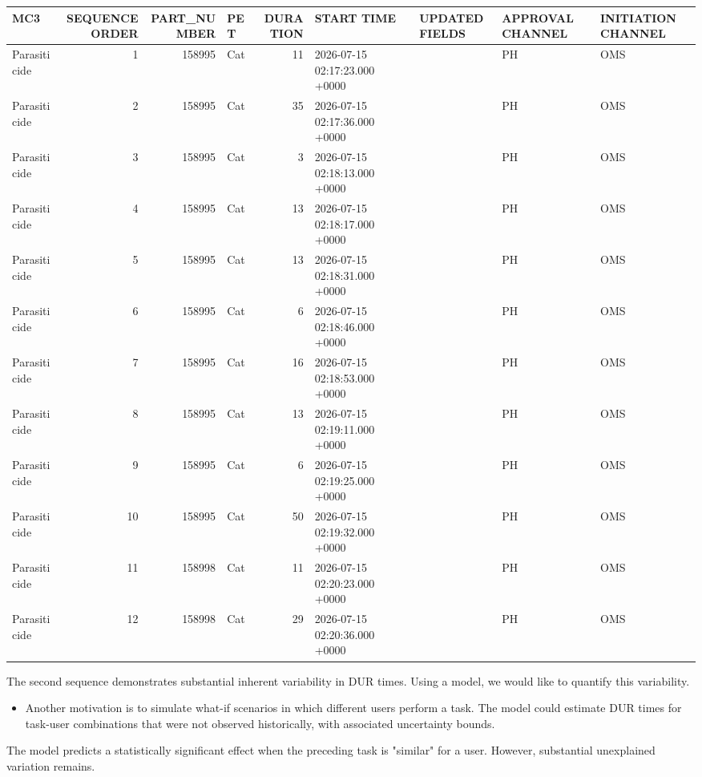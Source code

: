 \documentclass[
]{article}
\newcounter{none} %
\providecommand{\tightlist}{%
  \setlength{\itemsep}{0pt}\setlength{\parskip}{0pt}}
\begin{document}
{\def\LTcaptype{none} %
\begin{longtable}[]{@{}lrrlrllll@{}}
\toprule\noalign{}
MC3 & SEQUENCE ORDER & PART\_NUMBER & PET & DURATION & START TIME &
UPDATED FIELDS & APPROVAL CHANNEL & INITIATION CHANNEL \\
\midrule\noalign{}
\endhead
\bottomrule\noalign{}
\endlastfoot
Parasiticide & 1 & 158995 & Cat & 11 & 2026-07-15 02:17:23.000 +0000 & &
PH & OMS \\
Parasiticide & 2 & 158995 & Cat & 35 & 2026-07-15 02:17:36.000 +0000 & &
PH & OMS \\
Parasiticide & 3 & 158995 & Cat & 3 & 2026-07-15 02:18:13.000 +0000 & &
PH & OMS \\
Parasiticide & 4 & 158995 & Cat & 13 & 2026-07-15 02:18:17.000 +0000 & &
PH & OMS \\
Parasiticide & 5 & 158995 & Cat & 13 & 2026-07-15 02:18:31.000 +0000 & &
PH & OMS \\
Parasiticide & 6 & 158995 & Cat & 6 & 2026-07-15 02:18:46.000 +0000 & &
PH & OMS \\
Parasiticide & 7 & 158995 & Cat & 16 & 2026-07-15 02:18:53.000 +0000 & &
PH & OMS \\
Parasiticide & 8 & 158995 & Cat & 13 & 2026-07-15 02:19:11.000 +0000 & &
PH & OMS \\
Parasiticide & 9 & 158995 & Cat & 6 & 2026-07-15 02:19:25.000 +0000 & &
PH & OMS \\
Parasiticide & 10 & 158995 & Cat & 50 & 2026-07-15 02:19:32.000 +0000 &
& PH & OMS \\
Parasiticide & 11 & 158998 & Cat & 11 & 2026-07-15 02:20:23.000 +0000 &
& PH & OMS \\
Parasiticide & 12 & 158998 & Cat & 29 & 2026-07-15 02:20:36.000 +0000 &
& PH & OMS \\
\end{longtable}
}

The second sequence demonstrates substantial inherent variability in DUR
times. Using a model, we would like to quantify this variability.

\begin{itemize}
\tightlist
\item
  Another motivation is to simulate what-if scenarios in which different
  users perform a task. The model could estimate DUR times for task-user
  combinations that were not observed historically, with associated
  uncertainty bounds.
\end{itemize}

The model predicts a statistically significant effect when the preceding
task is "similar" for a user. However, substantial unexplained variation
remains.
\end{document}

